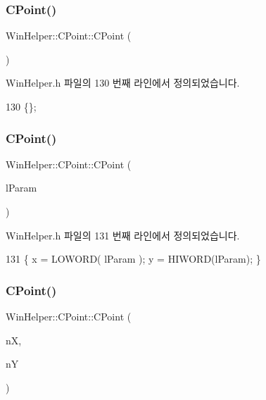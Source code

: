 \subsubsection{\texorpdfstring{C\+Point()}{CPoint()}\hspace{0.1cm}{\footnotesize\ttfamily [1/4]}}
{\footnotesize\ttfamily Win\+Helper\+::\+C\+Point\+::\+C\+Point (\begin{DoxyParamCaption}{ }\end{DoxyParamCaption})\hspace{0.3cm}{\ttfamily [inline]}}



Win\+Helper.\+h 파일의 130 번째 라인에서 정의되었습니다.


\begin{DoxyCode}
130 \{\};
\end{DoxyCode}
\mbox{\label{class_win_helper_1_1_c_point_a1c07b1e078177dbd626443830d1bd8c8}} 
\subsubsection{\texorpdfstring{C\+Point()}{CPoint()}\hspace{0.1cm}{\footnotesize\ttfamily [2/4]}}
{\footnotesize\ttfamily Win\+Helper\+::\+C\+Point\+::\+C\+Point (\begin{DoxyParamCaption}\item[{L\+P\+A\+R\+AM}]{l\+Param }\end{DoxyParamCaption})\hspace{0.3cm}{\ttfamily [inline]}}



Win\+Helper.\+h 파일의 131 번째 라인에서 정의되었습니다.


\begin{DoxyCode}
131 \{ x = LOWORD( lParam ); y = HIWORD(lParam); \}
\end{DoxyCode}
\mbox{\label{class_win_helper_1_1_c_point_af80910f72f637b0cbbe5f45cdf692d70}} 
\subsubsection{\texorpdfstring{C\+Point()}{CPoint()}\hspace{0.1cm}{\footnotesize\ttfamily [3/4]}}
{\footnotesize\ttfamily Win\+Helper\+::\+C\+Point\+::\+C\+Point (\begin{DoxyParamCaption}\item[{\mbox{\hyperlink{_util_8cpp_a0ef32aa8672df19503a49fab2d0c8071}{int}}}]{nX,  }\item[{\mbox{\hyperlink{_util_8cpp_a0ef32aa8672df19503a49fab2d0c8071}{int}}}]{nY }\end{DoxyParamCaption})\hspace{0.3cm}{\ttfamily [inline]}}




